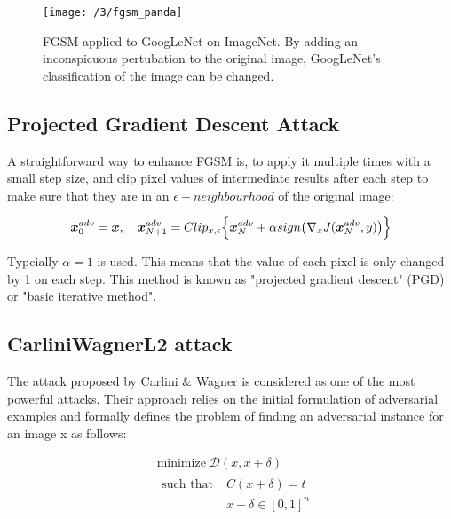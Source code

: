 \begin{figure}
	\centering
	\texttt{[image: /3/fgsm\_panda]}
    \caption{FGSM applied to GoogLeNet \cite{szegedy2015going} on ImageNet. By
    adding an inconspicuous pertubation to the original image, GoogLeNet's
    classification of the image can be changed.} 
	\label{fig:fgsm_panda}
\end{figure}

\subsection{Projected Gradient Descent Attack}
A straightforward way to enhance FGSM is, to apply it multiple times with a
small step size, and clip pixel values of intermediate results after each step
to make sure that they are in an $\epsilon-neighbourhood$  of the original
image:


\begin{equation}\label{eq:pgd}
    \boldsymbol{x}^{adv}_{0} = \boldsymbol{x}, \quad \boldsymbol{x}^{adv}_{N + 1}=Clip_{x, \epsilon} \Big \{\boldsymbol{x}^{adv}_{N} + \alpha sign\big(\nabla_{x}J(\boldsymbol{x}^{adv}_{N}, y)\big)  \Big\}
\end{equation}

Typcially $\alpha = 1$ is used. This means that the value of each pixel is only
changed by 1 on each step. This method is known as "projected gradient descent"
(PGD) or "basic iterative method". \cite{kurakin2016adversarial, madry2017towards}

\subsection{CarliniWagnerL2 attack}
The attack proposed by Carlini \& Wagner \cite{carlini2017towards} is considered
as one of the most powerful attacks. Their approach relies on the initial
formulation of adversarial examples \cite{szegedy2013intriguing} and formally 
defines the problem of finding an adversarial instance for an image x as follows:

\begin{align}
    & \text{minimize} \; \mathcal{D}(x, x + \delta) \\
    & \begin{aligned}
        \text{such that}  \;    & C(x + \delta) = t \\
                                & x + \delta \in [0, 1]^n 
    \end{aligned}
\end{align} 


